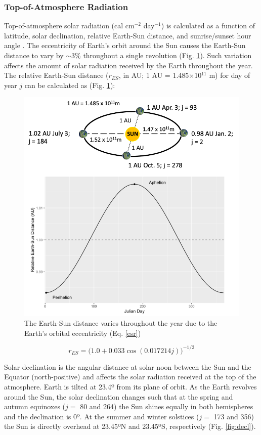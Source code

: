 \documentclass[a4paper, 12pt] {report}
\begin{document}
\subsubsection{Top-of-Atmosphere Radiation}

Top-of-atmosphere solar radiation (cal cm$^{-2}$ day$^{-1}$) is calculated as a function of latitude, solar declination, relative Earth-Sun distance, and sunrise/sunset hour angle \cite{brockCalculatingSolarRadiation1981}. The eccentricity of Earth's orbit around the Sun causes the Earth-Sun distance to vary by $\sim$3\% throughout a single revolution \cite{brockCalculatingSolarRadiation1981} (Fig. \ref{fig:esdist}). Such variation affects the amount of solar radiation received by the Earth throughout the year. The relative Earth-Sun distance ($r_{ES}$, in AU; 1 AU = 1.485$\times$10$^{11}$ m) for day of year $j$ can be calculated as \cite{brockCalculatingSolarRadiation1981, nichollsSolarRadiationCharts1979} (Fig. \ref{fig:esdist}):

\begin{figure}
  \includegraphics[width=0.75\linewidth]{Figures/Earth_Sun_Distance.png}
  \caption{The Earth-Sun distance varies throughout the year due to the Earth's orbital eccentricity (Eq. \ref{esr})}
  \label{fig:esdist}
\end{figure}

\begin{equation}\label{esr}
r_{ES} = \Big(1.0 + 0.033\cos{(0.017214j)}\Big)^{-1/2}
\end{equation}

Solar declination is the angular distance at solar noon between the Sun and the Equator (north-positive) and affects the solar radiation received at the top of the atmosphere. Earth is tilted at 23.4º from its plane of orbit. As the Earth revolves around the Sun, the solar declination changes such that at the spring and autumn equinoxes ($j =$ 80 and 264) the Sun shines equally in both hemispheres and the declination is 0º. At the summer and winter solstices ($j=$ 173 and 356) the Sun is directly overhead at 23.45ºN and 23.45ºS, respectively \cite{brockCalculatingSolarRadiation1981} (Fig. \ref{fig:decl}).
\end{document}
